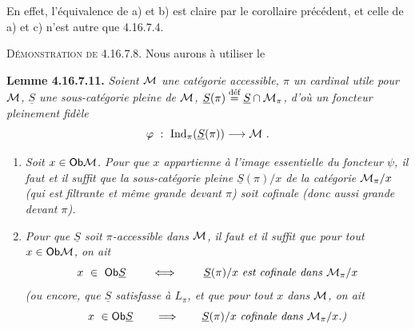 \noindent En effet, l'équivalence de a) et b) est claire par le corollaire précédent, et celle de a) et c) n'est autre que 4.16.7.4.

\noindent\textsc{Démonstration de} 4.16.7.8. Nous aurons à utiliser le

\noindent\textbf{Lemme 4.16.7.11.} \textit{Soient $\cM$ une catégorie accessible, $\pi$ un cardinal utile pour $\cM$, $\underline{S}$ une sous-catégorie pleine de $\cM$, $\underline{S}(\pi)\defeq\underline{S}\cap\cM_\pi$, d'où un foncteur pleinement fidèle}
\[
\varphi \ : \ \Ind_\pi(\underline{S}(\pi)) \longrightarrow \cM \ .
\]

\begin{enumerate}
\item[\textit{a)}] \textit{Soit $x\in\Ob\cM$. Pour que $x$ appartienne à l'image essentielle du foncteur $\psi$, il faut et il suffit que la sous-catégorie pleine $\underline{S}(\pi)/x$ de la catégorie $\cM_\pi/x$ (qui est filtrante et même grande devant $\pi$) soit cofinale (donc aussi grande devant $\pi$).} %
\item[\textit{b)}] \textit{Pour que $\underline{S}$ soit $\pi$-accessible dans $\cM$, il faut et il suffit que pour tout $x\in\Ob\cM$, on ait}
\[
x \ \in \ \Ob\underline{S} \qquad\iff\qquad \underline{S}(\pi)/x \text{ \textit{est cofinale dans} } \cM_\pi/x
\]
\textit{(ou encore, que $\underline{S}$ satisfasse à $L_\pi$, et que pour tout $x$ dans $\cM$, on ait}
\[
x \ \in\Ob\underline{S} \qquad\Longrightarrow\qquad \underline{S}(\pi)/x \text{ \textit{cofinale dans} } \cM_\pi/x\text{\textit{.)}}
\]
\end{enumerate}

